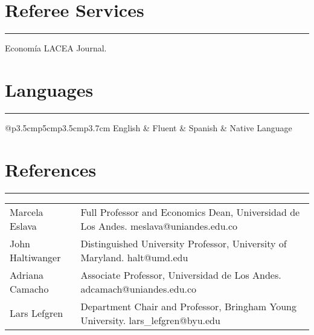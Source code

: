 \documentclass[12pt, letterpaper]{article}
\begin{document}
\vspace*{-5mm}

\section*{Referee Services}
\vspace*{-8mm}
\noindent \rule{\linewidth}{0.2mm}
\noindent Economía LACEA Journal.

\vspace{-4mm}

\section*{Languages}
\vspace*{-8mm}
\noindent \rule{\linewidth}{0.2mm}
\noindent
\begin{tabular}{@{}p{3.5cm}p{5cm}p{3.5cm}p{3.7cm}}
English & Fluent	&  Spanish & Native Language \\
\end{tabular}

\vspace{-4mm}

\section*{References}
\vspace*{-8mm}
\noindent \rule{\linewidth}{0.2mm}
\noindent
\begin{tabular}{@{}p{3.5cm}p{13.7cm}}
\\ [-3mm]
Marcela Eslava & Full Professor and Economics Dean, Universidad de Los Andes. meslava@uniandes.edu.co \\ [8mm]
John Haltiwanger & Distinguished University Professor, University of Maryland. halt@umd.edu \\ [4mm]
Adriana Camacho	& Associate Professor, Universidad de Los Andes. adcamach@uniandes.edu.co
\\ [4mm]
Lars Lefgren & Department Chair and Professor, Bringham Young University. lars\_lefgren@byu.edu
\end{tabular}
\end{document}
